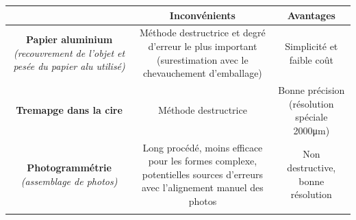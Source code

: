 \documentclass[]{article}
\begin{document}
\begin{longtable}[]{@{}ccc@{}}
\toprule
\begin{minipage}[b]{0.29\columnwidth}\centering
\strut
\end{minipage} & \begin{minipage}[b]{0.29\columnwidth}\centering
Inconvénients\strut
\end{minipage} & \begin{minipage}[b]{0.33\columnwidth}\centering
Avantages\strut
\end{minipage}\tabularnewline
\midrule
\endhead
\begin{minipage}[t]{0.29\columnwidth}\centering
\textbf{Papier aluminium} \emph{(recouvrement de l'objet et pesée du
papier alu utilisé)}\strut
\end{minipage} & \begin{minipage}[t]{0.29\columnwidth}\centering
Méthode destructrice et degré d'erreur le plus important (surestimation
avec le chevauchement d'emballage)\strut
\end{minipage} & \begin{minipage}[t]{0.33\columnwidth}\centering
Simplicité et faible coût\strut
\end{minipage}\tabularnewline
\begin{minipage}[t]{0.29\columnwidth}\centering
\textbf{Tremapge dans la cire}\strut
\end{minipage} & \begin{minipage}[t]{0.29\columnwidth}\centering
Méthode destructrice\strut
\end{minipage} & \begin{minipage}[t]{0.33\columnwidth}\centering
Bonne précision (résolution spéciale 2000μm)\strut
\end{minipage}\tabularnewline
\begin{minipage}[t]{0.29\columnwidth}\centering
\textbf{Photogrammétrie} \emph{(assemblage de photos)}\strut
\end{minipage} & \begin{minipage}[t]{0.29\columnwidth}\centering
Long procédé, moins efficace pour les formes complexe, potentielles
sources d'erreurs avec l'alignement manuel des photos\strut
\end{minipage} & \begin{minipage}[t]{0.33\columnwidth}\centering
Non destructive, bonne résolution\strut
\end{minipage}\tabularnewline
\begin{minipage}[t]{0.29\columnwidth}\centering

\end{minipage}
\end{longtable}
\end{document}

